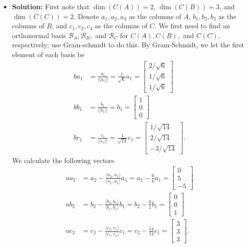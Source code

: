 \documentclass[11pt]{article}
\begin{document}
\begin{itemize}
\item[] {\bf Solution:}  First note that $\dim(C(A)) = 2$, $\dim(C(B)) = 3$, and $\dim(C(C)) = 2$.  Denote $a_1,a_2,a_3$ as the columns of $A$, $b_1,b_2,b_3$ as the columns of $B$, and $c_1,c_2,c_3$ as the columns of $C$.  We first need to find an orthonormal basis $\mathcal{B}_A, \mathcal{B}_B,$ and $\mathcal{B}_C$ for $C(A), C(B),$ and $C(C)$, respectively; use Gram-schmidt to do this.  By Gram-Schmidt, we let the first element of each basis be
\begin{align*}
ba_1 &= \frac{a_1}{||a_1||} = \frac{1}{\sqrt{6}}a_1 = \begin{bmatrix}
2 / \sqrt{6} \\ 1 / \sqrt{6} \\ 1 / \sqrt{6}
\end{bmatrix} \\
bb_1 &= \frac{b_1}{||b_1||} = b_1 = \begin{bmatrix}
1 \\ 0 \\ 0
\end{bmatrix} \\
bc_1 &= \frac{c_1}{||c_1||} = \frac{1}{\sqrt{14}}c_1 = \begin{bmatrix}
1 / \sqrt{14} \\ 2 /\sqrt{14} \\ -3/\sqrt{14}
\end{bmatrix}.
\end{align*}
We calculate the following vectors
\begin{align*}
ua_2 &= a_2 - \frac{\langle a_2, a_1 \rangle}{\langle a_1, a_1 \rangle}a_1 = a_2 - \frac{0}{6}a_1 = \begin{bmatrix}
0 \\ 5 \\ -5
\end{bmatrix} \\
ub_2 &= b_2 - \frac{\langle b_2, b_1\rangle}{\langle b_1,b_1\rangle}b_1 = b_2 - \frac{0}{1} b_1 = \begin{bmatrix}
0 \\ 0 \\ 1
\end{bmatrix} \\
uc_2 &= c_2 - \frac{\langle c_2, c_1 \rangle}{\langle c_1, c_1 \rangle}c_1 = c_2 - \frac{14}{14}c_1 = \begin{bmatrix}
3 \\ 3 \\ 3
\end{bmatrix}.

\end{align*}
\end{itemize}
\end{document}
